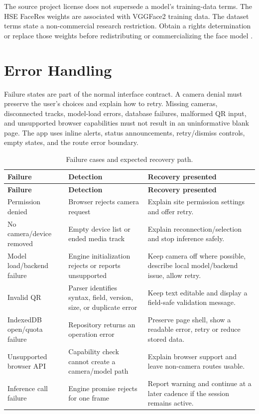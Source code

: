 \documentclass[11pt,oneside,openany]{report}
\begin{document}
\begin{cautionbox}
The source project license does not supersede a model's training-data terms. The HSE FaceRes weights are associated with VGGFace2 training data. The dataset terms state a non-commercial research restriction. Obtain a rights determination or replace those weights before redistributing or commercializing the face model \cite{vggTerms}.
\end{cautionbox}

\chapter{Error Handling}
Failure states are part of the normal interface contract. A camera denial must preserve the user's choices and explain how to retry. Missing cameras, disconnected tracks, model-load errors, database failures, malformed QR input, and unsupported browser capabilities must not result in an uninformative blank page. The app uses inline alerts, status announcements, retry/dismiss controls, empty states, and the route error boundary.

\begin{longtable}{>{\raggedright\arraybackslash}p{}p{}p{}}
\caption{Failure cases and expected recovery path.}\label{tab:errors}\\
\toprule
\textbf{Failure} & \textbf{Detection} & \textbf{Recovery presented} \\
\midrule
\endfirsthead
\toprule
\textbf{Failure} & \textbf{Detection} & \textbf{Recovery presented} \\
\midrule
\endhead
Permission denied & Browser rejects camera request & Explain site permission settings and offer retry. \\
No camera/device removed & Empty device list or ended media track & Explain reconnection/selection and stop inference safely. \\
Model load/backend failure & Engine initialization rejects or reports unsupported & Keep camera off where possible, describe local model/backend issue, allow retry. \\
Invalid QR & Parser identifies syntax, field, version, size, or duplicate error & Keep text editable and display a field-safe validation message. \\
IndexedDB open/quota failure & Repository returns an operation error & Preserve page shell, show a readable error, retry or reduce stored data. \\
Unsupported browser API & Capability check cannot create a camera/model path & Explain browser support and leave non-camera routes usable. \\
Inference call failure & Engine promise rejects for one frame & Report warning and continue at a later cadence if the session remains active. \\
\bottomrule
\end{longtable}
\end{document}
